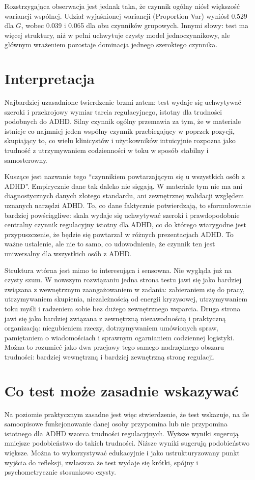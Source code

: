 \documentclass[11pt,a4paper]{article}
\begin{document}
Rozstrzygająca obserwacja jest jednak taka, że czynnik ogólny niósł większość wariancji wspólnej. Udział wyjaśnionej wariancji (Proportion Var) wyniósł 0.529 dla $G$, wobec 0.039 i 0.065 dla obu czynników grupowych. Innymi słowy: test ma więcej struktury, niż w pełni uchwytuje czysty model jednoczynnikowy, ale głównym wrażeniem pozostaje dominacja jednego szerokiego czynnika.

\section{Interpretacja}
Najbardziej uzasadnione twierdzenie brzmi zatem: test wydaje się uchwytywać szeroki i przekrojowy wymiar tarcia regulacyjnego, istotny dla trudności podobnych do ADHD. Silny czynnik ogólny przemawia za tym, że w materiale istnieje co najmniej jeden wspólny czynnik przebiegający w poprzek pozycji, skupiający to, co wielu klinicystów i użytkowników intuicyjnie rozpozna jako trudność z utrzymywaniem codzienności w toku w sposób stabilny i samosterowny.

Kuszące jest nazwanie tego ``czynnikiem powtarzającym się u wszystkich osób z ADHD''. Empirycznie dane tak daleko nie sięgają. W materiale tym nie ma ani diagnostycznych danych złotego standardu, ani zewnętrznej walidacji względem uznanych narzędzi ADHD. To, co dane faktycznie potwierdzają, to sformułowanie bardziej powściągliwe: skala wydaje się uchwytywać szeroki i prawdopodobnie centralny czynnik regulacyjny istotny dla ADHD, co do którego wiarygodne jest przypuszczenie, że będzie się powtarzał w różnych prezentacjach ADHD. To ważne ustalenie, ale nie to samo, co udowodnienie, że czynnik ten jest uniwersalny dla wszystkich osób z ADHD.

Struktura wtórna jest mimo to interesująca i sensowna. Nie wygląda już na czysty szum. W nowszym rozwiązaniu jedna strona testu jawi się jako bardziej związana z wewnętrznym zaangażowaniem w zadania: zabieraniem się do pracy, utrzymywaniem skupienia, niezależnością od energii kryzysowej, utrzymywaniem toku myśli i radzeniem sobie bez dużego zewnętrznego wsparcia. Druga strona jawi się jako bardziej związana z zewnętrzną niezawodnością i praktyczną organizacją: niegubieniem rzeczy, dotrzymywaniem umówionych spraw, pamiętaniem o wiadomościach i sprawnym ogarnianiem codziennej logistyki. Można to rozumieć jako dwa przejawy tego samego nadrzędnego obszaru trudności: bardziej wewnętrzną i bardziej zewnętrzną stronę regulacji.

\section{Co test może zasadnie wskazywać}
Na poziomie praktycznym zasadne jest więc stwierdzenie, że test wskazuje, na ile samoopisowe funkcjonowanie danej osoby przypomina lub nie przypomina istotnego dla ADHD wzorca trudności regulacyjnych. Wyższe wyniki sugerują mniejsze podobieństwo do takich trudności. Niższe wyniki sugerują podobieństwo większe. Można to wykorzystywać edukacyjnie i jako ustrukturyzowany punkt wyjścia do refleksji, zwłaszcza że test wydaje się krótki, spójny i psychometrycznie stosunkowo czysty.
\end{document}

